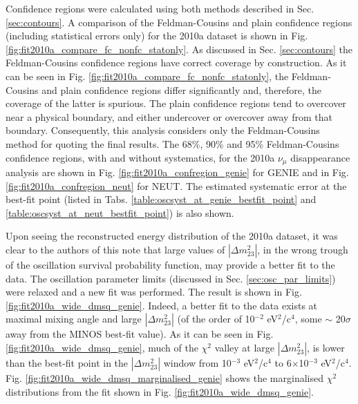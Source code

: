 Confidence regions were calculated using both methods described in Sec. \ref{sec:contours}.
A comparison of the Feldman-Cousins and plain confidence regions (including statistical errors only) 
for the 2010a dataset is shown in Fig. \ref{fig:fit2010a_compare_fc_nonfc_statonly}.
As discussed in Sec. \ref{sec:contours} the Feldman-Cousins confidence regions have correct coverage 
by construction. 
As it can be seen in Fig. \ref{fig:fit2010a_compare_fc_nonfc_statonly},
the Feldman-Cousins and plain confidence regions differ significantly
and, therefore, the coverage of the latter is spurious.
The plain confidence regions tend to overcover near a physical boundary, and either
undercover or overcover away from that boundary. 
Consequently, this analysis considers only the Feldman-Cousins method for quoting
the final results.
The 68\%, 90\% and 95\% Feldman-Cousins confidence regions, with and without systematics, for the 2010a
$\nu_{\mu}$ disappearance analysis are shown in
Fig. \ref{fig:fit2010a_confregion_genie} for GENIE and in
Fig. \ref{fig:fit2010a_confregion_neut} for NEUT.
The estimated systematic error at the best-fit point 
(listed in Tabs. \ref{table:oscsyst_at_genie_bestfit_point} and \ref{table:oscsyst_at_neut_bestfit_point})
is also shown.

Upon seeing the reconstructed energy distribution of the 2010a dataset, it was clear to the authors
of this note that large values of $|\Delta m^{2}_{23}|$, in the wrong trough of the oscillation survival
probability function, may provide a better fit to the data.
The oscillation parameter limits (discussed in Sec. \ref{sec:osc_par_limits}) were relaxed and a new fit
was performed. The result is shown in Fig. \ref{fig:fit2010a_wide_dmsq_genie}.
Indeed, a better fit to the data exists at maximal mixing angle and
large $|\Delta m^{2}_{23}|$ (of the order of 10$^{-2}$ eV$^{2}$/c$^{4}$,
some $\sim$ 20$\sigma$ away from the MINOS best-fit value).
As it can be seen in Fig. \ref{fig:fit2010a_wide_dmsq_genie},
much of the $\chi^{2}$ valley at large $|\Delta m^{2}_{23}|$, is lower than the
best-fit point in the 
$|\Delta m^{2}_{23}|$ window
from 10$^{-3}$ eV$^{2}$/c$^{4}$ to 6$\times$10$^{-3}$ eV$^{2}$/c$^{4}$.
Fig. \ref{fig:fit2010a_wide_dmsq_marginalised_genie} shows 
the marginalised $\chi^{2}$ distributions from the fit shown in Fig. \ref{fig:fit2010a_wide_dmsq_genie}.

